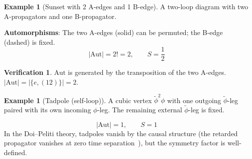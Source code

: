 \documentclass[11pt,a4paper]{article}
\theoremstyle{definition}
\newtheorem{example}[theorem]{Example}
\newtheorem*{verification}{Verification}
\newcommand{\phit}{\tilde{\phi}}
\newcommand{\Aut}{\mathrm{Aut}}
\begin{document}
\begin{example}[Sunset with 2 A-edges and 1 B-edge]
\label{ex:sunset_mixed}
A two-loop diagram with two A-propagators and one B-propagator.

\begin{center}
\end{center}

\textbf{Automorphisms}: The two \textcolor{blue!70!black}{A-edges} (solid)
can be permuted; the \textcolor{orange!80!black}{B-edge} (dashed) is fixed.
\begin{equation}
|\Aut| = 2! = 2, \qquad S = \frac{1}{2}
\end{equation}

\begin{verification}
$\Aut$ is generated by the transposition of the two A-edges.
$|\Aut| = |\{e, (12)\}| = 2$. \checkmark
\end{verification}
\end{example}

\begin{example}[Tadpole (self-loop)]
A cubic vertex $\phit^2\phi$ with one outgoing $\phit$-leg paired with
its own incoming $\phi$-leg. The remaining external $\phit$-leg is fixed.

\begin{center}
\end{center}

\begin{equation}
|\Aut| = 1, \qquad S = 1
\end{equation}
In the Doi--Peliti theory, tadpoles vanish by the causal structure
(the retarded propagator vanishes at zero time separation~\cite{tauber2005}),
but the symmetry factor is well-defined.
\end{example}
\end{document}
